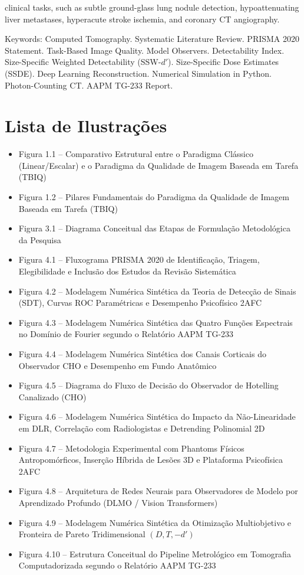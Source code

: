 \documentclass[
  12pt,
  a4paper,
  oneside
]{report}
\begin{document}
clinical tasks, such as subtle ground-glass lung nodule detection, hypoattenuating liver metastases, hyperacute stroke ischemia, and coronary CT angiography.

\vspace{0.8cm}
\noindent Keywords: Computed Tomography. Systematic Literature Review. PRISMA 2020 Statement. Task-Based Image Quality. Model Observers. Detectability Index. Size-Specific Weighted Detectability (SSW-$d'$). Size-Specific Dose Estimates (SSDE). Deep Learning Reconstruction. Numerical Simulation in Python. Photon-Counting CT. AAPM TG-233 Report.
\clearpage

\chapter*{Lista de Ilustrações}
\begin{itemize}[leftmargin=*,label={}]
  \item Figura 1.1 -- Comparativo Estrutural entre o Paradigma Clássico (Linear/Escalar) e o Paradigma da Qualidade de Imagem Baseada em Tarefa (TBIQ) 
  \item Figura 1.2 -- Pilares Fundamentais do Paradigma da Qualidade de Imagem Baseada em Tarefa (TBIQ) 
  \item Figura 3.1 -- Diagrama Conceitual das Etapas de Formulação Metodológica da Pesquisa 
  \item Figura 4.1 -- Fluxograma PRISMA 2020 de Identificação, Triagem, Elegibilidade e Inclusão dos Estudos da Revisão Sistemática 
  \item Figura 4.2 -- Modelagem Numérica Sintética da Teoria de Detecção de Sinais (SDT), Curvas ROC Paramétricas e Desempenho Psicofísico 2AFC 
  \item Figura 4.3 -- Modelagem Numérica Sintética das Quatro Funções Espectrais no Domínio de Fourier segundo o Relatório AAPM TG-233 
  \item Figura 4.4 -- Modelagem Numérica Sintética dos Canais Corticais do Observador CHO e Desempenho em Fundo Anatômico 
  \item Figura 4.5 -- Diagrama do Fluxo de Decisão do Observador de Hotelling Canalizado (CHO) 
  \item Figura 4.6 -- Modelagem Numérica Sintética do Impacto da Não-Linearidade em DLR, Correlação com Radiologistas e Detrending Polinomial 2D 
  \item Figura 4.7 -- Metodologia Experimental com Phantoms Físicos Antropomórficos, Inserção Híbrida de Lesões 3D e Plataforma Psicofísica 2AFC 
  \item Figura 4.8 -- Arquitetura de Redes Neurais para Observadores de Modelo por Aprendizado Profundo (DLMO / Vision Transformers) 
  \item Figura 4.9 -- Modelagem Numérica Sintética da Otimização Multiobjetivo e Fronteira de Pareto Tridimensional $(D, T, -d')$ 
  \item Figura 4.10 -- Estrutura Conceitual do Pipeline Metrológico em Tomografia Computadorizada segundo o Relatório AAPM TG-233 
\end{itemize}
\end{document}
